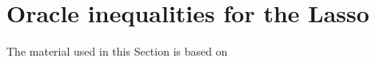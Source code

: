 \documentclass[
	fontsize=11pt, %
	twoside=false, %
	numbers=noenddot, %
]{kaobook}
\DeclareMathOperator{\cF}{{\mathcal F}}
\DeclareMathOperator{\bX}{{\boldsymbol X}}
\DeclareMathOperator{\nor}{Normal}
\newcommand{\eps}{\varepsilon}
\newcommand{\norm}[1]{\| #1 \|}
\begin{document}
\section{Oracle inequalities for the Lasso} %


The material used in this Section is based on 

\end{document}
